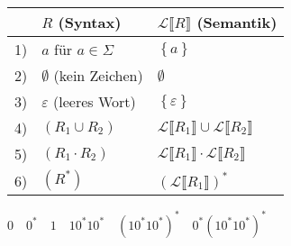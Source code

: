 \documentclass[
	final,
	a4paper,
	oneside,
	parskip=full,
	headings=standardclasses,
	headings=big,
	pointednumbers
]{scrartcl}
\newcommand{\kl}[1]{{\left( #1 \right)}}
\begin{document}
    \renewcommand{\arraystretch}{1.5}
    \begin{tabular}{l|l|l}
        \multicolumn{1}{l}{} &
        \multicolumn{1}{l}{$R$ (Syntax)} &
        \multicolumn{1}{l}{$\mathscr{L} \llbracket R \rrbracket$ (Semantik)} \\
        \hline
        1) & $a$ für $a \in \Sigma$                         & $\left\{ a \right\}$ \\
        2) & $\emptyset$ (kein Zeichen)                     & $\emptyset$ \\
        3) & $\varepsilon$ (leeres Wort)                    & $\left\{ \varepsilon \right\}$ \\
        \hline
        4) & $\left(R_1 \cup R_2\right)$                    & $\mathscr{L} \llbracket R_1 \rrbracket \cup
                                                               \mathscr{L} \llbracket R_2 \rrbracket$ \\
        5) & $\left(R_1 \cdot R_2\right)$                   & $\mathscr{L} \llbracket R_1 \rrbracket \cdot
                                                               \mathscr{L} \llbracket R_2 \rrbracket$ \\
        6) & $\left(R^*\right)$                             & $\left( \mathscr{L} \llbracket R_1
                                                              \rrbracket \right)^*$
    \end{tabular}
    
    

    \newpage

    $ 0 \quad 0^* \quad 1 \quad 10^*10^* \quad \kl{10^*10^*}^* \quad 0^*\kl{10^*10^*}^* $
\end{document}
